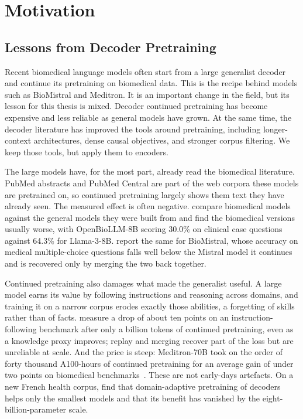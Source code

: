 \section{Motivation}

\subsection{Lessons from Decoder Pretraining}
\label{sec:decoder-cpt-stops}

Recent biomedical language models often start from a large generalist decoder and continue its pretraining on biomedical data. This is the recipe behind models such as BioMistral and Meditron. It is an important change in the field, but its lesson for this thesis is mixed. Decoder continued pretraining has become expensive and less reliable as general models have grown. At the same time, the decoder literature has improved the tools around pretraining, including longer-context architectures, dense causal objectives, and stronger corpus filtering. We keep those tools, but apply them to encoders.

The large models have, for the most part, already read the biomedical literature. PubMed abstracts and PubMed Central are part of the web corpora these models are pretrained on, so continued pretraining largely shows them text they have already seen. The measured effect is often negative. \citet{dorfner2024biomedical} compare biomedical models against the general models they were built from and find the biomedical versions usually worse, with OpenBioLLM-8B scoring 30.0\% on clinical case questions against 64.3\% for Llama-3-8B. \citet{labrak-etal-2024-biomistral} report the same for BioMistral, whose accuracy on medical multiple-choice questions falls well below the Mistral model it continues and is recovered only by merging the two back together.

Continued pretraining also damages what made the generalist useful. A large model earns its value by following instructions and reasoning across domains, and training it on a narrow corpus erodes exactly those abilities, a forgetting of skills rather than of facts. \citet{jindal_balancing_2024} measure a drop of about ten points on an instruction-following benchmark after only a billion tokens of continued pretraining, even as a knowledge proxy improves; replay and merging recover part of the loss but are unreliable at scale. And the price is steep: Meditron-70B took on the order of forty thousand A100-hours of continued pretraining for an average gain of under two points on biomedical benchmarks~\citep{chen2023meditron}. These are not early-days artefacts. On a new French health corpus, \citet{mannion_biomedical_2026} find that domain-adaptive pretraining of decoders helps only the smallest models and that its benefit has vanished by the eight-billion-parameter scale.

